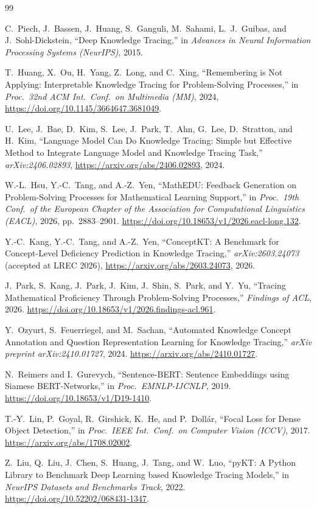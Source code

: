 \documentclass[11pt]{article}
\begin{document}
\begin{thebibliography}{99}
\small
\setlength{\itemsep}{2pt}

C.~Piech, J.~Bassen, J.~Huang, S.~Ganguli, M.~Sahami, L.~J.~Guibas, and
J.~Sohl-Dickstein, ``Deep Knowledge Tracing,'' in \emph{Advances in Neural
Information Processing Systems (NeurIPS)}, 2015.

T.~Huang, X.~Ou, H.~Yang, Z.~Long, and C.~Xing, ``Remembering is Not Applying:
Interpretable Knowledge Tracing for Problem-Solving Processes,'' in \emph{Proc.\ 32nd
ACM Int.\ Conf.\ on Multimedia (MM)}, 2024, \url{https://doi.org/10.1145/3664647.3681049}.

U.~Lee, J.~Bae, D.~Kim, S.~Lee, J.~Park, T.~Ahn, G.~Lee, D.~Stratton, and H.~Kim,
``Language Model Can Do Knowledge Tracing: Simple but Effective Method to Integrate
Language Model and Knowledge Tracing Task,'' \emph{arXiv:2406.02893}, \url{https://arxiv.org/abs/2406.02893},
2024.

W.-L.~Hsu, Y.-C.~Tang, and A.-Z.~Yen, ``MathEDU: Feedback Generation on
Problem-Solving Processes for Mathematical Learning Support,'' in \emph{Proc.\ 19th
Conf.\ of the European Chapter of the Association for Computational Linguistics
(EACL)}, 2026, pp.~2883--2901. \url{https://doi.org/10.18653/v1/2026.eacl-long.132}.

Y.-C.~Kang, Y.-C.~Tang, and A.-Z.~Yen, ``ConceptKT: A Benchmark for Concept-Level
Deficiency Prediction in Knowledge Tracing,'' \emph{arXiv:2603.24073} (accepted at LREC 2026), \url{https://arxiv.org/abs/2603.24073},
2026.

J.~Park, S.~Kang, J.~Park, J.~Kim, J.~Shin, S.~Park, and Y.~Yu, ``Tracing
Mathematical Proficiency Through Problem-Solving Processes,'' \emph{Findings of ACL}, 2026. \url{https://doi.org/10.18653/v1/2026.findings-acl.961}.

Y.~Ozyurt, S.~Feuerriegel, and M.~Sachan, ``Automated Knowledge Concept Annotation
and Question Representation Learning for Knowledge Tracing,'' \emph{arXiv preprint
arXiv:2410.01727}, 2024. \url{https://arxiv.org/abs/2410.01727}.

N.~Reimers and I.~Gurevych, ``Sentence-BERT: Sentence Embeddings using Siamese
BERT-Networks,'' in \emph{Proc.\ EMNLP-IJCNLP}, 2019. \url{https://doi.org/10.18653/v1/D19-1410}.

T.-Y.~Lin, P.~Goyal, R.~Girshick, K.~He, and P.~Doll\'ar, ``Focal Loss for Dense
Object Detection,'' in \emph{Proc.\ IEEE Int.\ Conf.\ on Computer Vision (ICCV)},
2017. \url{https://arxiv.org/abs/1708.02002}.

Z.~Liu, Q.~Liu, J.~Chen, S.~Huang, J.~Tang, and W.~Luo, ``pyKT: A Python
Library to Benchmark Deep Learning based Knowledge Tracing Models,'' in \emph{NeurIPS
Datasets and Benchmarks Track}, 2022. \url{https://doi.org/10.52202/068431-1347}.

\end{thebibliography}
\end{document}
